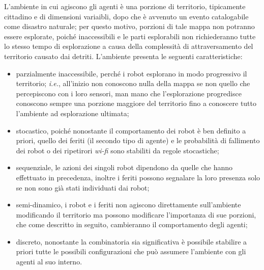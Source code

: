 L'ambiente in cui agiscono gli agenti è una porzione di territorio, tipicamente cittadino e di dimensioni variaibli, dopo che è avvenuto un evento catalogabile come disastro naturale; per questo motivo, porzioni di tale mappa non potranno essere esplorate, poiché inaccessibili e le parti esplorabili non richiederanno tutte lo stesso tempo di esplorazione a causa della complessità di attraversamento del territorio causato dai detriti.
L'ambiente presenta le seguenti caratteristiche:
\begin{itemize}
	\item parzialmente inaccessibile, perché i robot esplorano in modo progressivo il territorio; \textit{i.e.}, all'inizio non conoscono nulla della mappa se non quello che percepiscono con i loro sensori, man mano che l'esplorazione progredisce conoscono sempre una porzione maggiore del territorio fino a conoscere tutto l'ambiente ad esplorazione ultimata;
	\item stocastico, poiché nonostante il comportamento dei robot è ben definito a priori, quello dei feriti (il secondo tipo di agente) e le probabilità di fallimento dei robot o dei ripetirori \textit{wi-fi} sono stabiliti da regole stocastiche;
	\item sequenziale, le azioni dei singoli robot dipendono da quelle che hanno effettuato in precedenza, inoltre i feriti possono segnalare la loro presenza solo se non sono già stati individuati dai robot;
	\item semi-dinamico, i robot e i feriti non agiscono direttamente sull'ambiente modificando il territorio ma possono modificare l'importanza di sue porzioni, che come descritto in seguito, cambieranno il comportamento degli agenti;
	\item discreto, nonostante la combinatoria sia significativa è possibile stabilire a priori tutte le possibili configurazioni che può assumere l'ambiente con gli agenti al suo interno.
\end{itemize}

